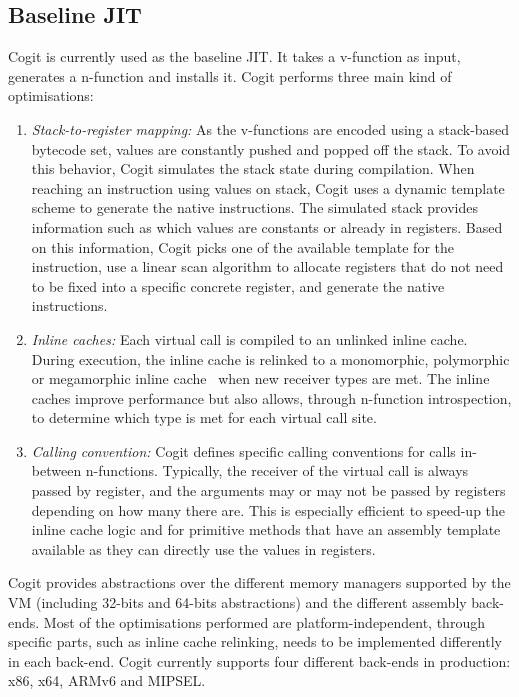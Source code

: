 \documentclass[a4paper,12pt,twoside]{../includes/ThesisStyle}
\begin{document}
\subsection{Baseline JIT}

Cogit is currently used as the baseline JIT. It takes a v-function as input, generates a n-function and installs it. Cogit performs three main kind of optimisations:
\begin{enumerate}
	\item \emph{Stack-to-register mapping:} As the v-functions are encoded using a stack-based bytecode set, values are constantly pushed and popped off the stack. To avoid this behavior, Cogit simulates the stack state during compilation. When reaching an instruction using values on stack, Cogit uses a dynamic template scheme to generate the native instructions. The simulated stack provides information such as which values are constants or already in registers. Based on this information, Cogit picks one of the available template for the instruction, use a linear scan algorithm to allocate registers that do not need to be fixed into a specific concrete register, and generate the native instructions.
	\item \emph{Inline caches:} Each virtual call is compiled to an unlinked inline cache. During execution, the inline cache is relinked to a monomorphic, polymorphic or megamorphic inline cache~\cite{Deut84a,Holz91a} when new receiver types are met. The inline caches improve performance but also allows, through n-function introspection, to determine which type is met for each virtual call site.
	\item \emph{Calling convention:} Cogit defines specific calling conventions for calls in-between n-functions. Typically, the receiver of the virtual call is always passed by register, and the arguments may or may not be passed by registers depending on how many there are. This is especially efficient to speed-up the inline cache logic and for primitive methods that have an assembly template available as they can directly use the values in registers.
\end{enumerate}

Cogit provides abstractions over the different memory managers supported by the VM (including 32-bits and 64-bits abstractions) and the different assembly back-ends. Most of the optimisations performed are platform-independent, through specific parts, such as inline cache relinking, needs to be implemented differently in each back-end. Cogit currently supports four different back-ends in production: x86, x64, ARMv6 and MIPSEL.
\end{document}
